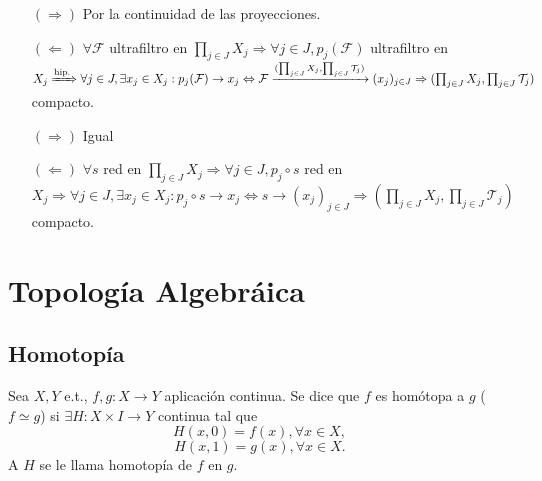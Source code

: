 \begin{dem}[Filtros]
  \begin{enumerate}[label=(\roman*)]
    \item []
    \item [$(\Rightarrow)$] Por la continuidad de las proyecciones.
    \item [$(\Leftarrow)$] $\forall \mathcal{F}$ ultrafiltro en $\prod_{j \in J} X_{j} \Rightarrow \forall j \in J, p_{j}(\mathcal{F})$ ultrafiltro en $X_{j} \xRightarrow[]{ \text{hip.} } \forall j \in J, \exists x_{j} \in X_{j} : p_{j}(\mathcal{F}) \rightarrow x_{j} \Leftrightarrow \mathcal{F} \xrightarrow[]{ ( \prod_{j \in J} X_{j}, \prod_{j \in J} \mathcal{T}_{j} ) } (x_{j})_{j \in J} \Rightarrow ( \prod_{j \in J} X_{j}, \prod_{j \in J} \mathcal{T}_{j} )$ compacto.
  \end{enumerate}
\end{dem}

\begin{dem}[Redes]
  \begin{enumerate}[label=(\roman*)]
    \item []
    \item [$(\Rightarrow)$] Igual
    \item [$(\Leftarrow)$] $\forall s$ red en $\prod_{j \in J} X_{j} \Rightarrow \forall j \in J, p_{j} \circ s$ red en $X_{j} \Rightarrow \forall j \in J, \exists x_{j} \in X_{j} : p_{j} \circ s \rightarrow x_{j} \Leftrightarrow s \rightarrow ( x_{j} )_{j \in J} \Rightarrow ( \prod_{j \in J} X_{j}, \prod_{j \in J} \mathcal{T}_{j} )$ compacto.
  \end{enumerate}
\end{dem}


\part{Topología Algebráica}
\chapter{Homotopía}

\begin{defn}[Homotopía]
  Sea $X, Y$ e.t., $f,g : X \to Y$ aplicación continua. Se dice que $f$ es homótopa a $g$ ($f \simeq g$) si $\exists H : X \times I \to Y$ continua tal que
  \[ 
    H(x,0) = f(x), \forall x \in X,
  \] 
  \[ 
    H(x,1) = g(x), \forall x \in X.
  \] 
  A $H$ se le llama homotopía de $f$ en $g$.
\end{defn}

